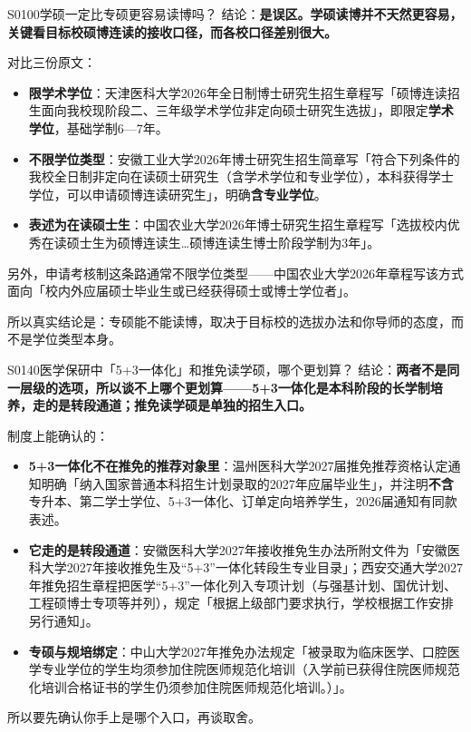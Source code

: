 \begin{qa}{S0100}{学硕一定比专硕更容易读博吗？}
结论：\textbf{是误区。学硕读博并不天然更容易，关键看目标校硕博连读的接收口径，而各校口径差别很大。}

对比三份原文：
\begin{itemize}
  \item \textbf{限学术学位}：天津医科大学2026年全日制博士研究生招生章程写「硕博连读招生面向我校现阶段二、三年级学术学位非定向硕士研究生选拔」，即限定\textbf{学术学位}，基础学制6—7年。
  \item \textbf{不限学位类型}：安徽工业大学2026年博士研究生招生简章写「符合下列条件的我校全日制非定向在读硕士研究生（含学术学位和专业学位），本科获得学士学位，可以申请硕博连读研究生」，明确\textbf{含专业学位}。
  \item \textbf{表述为在读硕士生}：中国农业大学2026年博士研究生招生章程写「选拔校内优秀在读硕士生为硕博连读生…硕博连读生博士阶段学制为3年」。
\end{itemize}

另外，申请考核制这条路通常不限学位类型——中国农业大学2026年章程写该方式面向「校内外应届硕士毕业生或已经获得硕士或博士学位者」。

所以真实结论是：专硕能不能读博，取决于目标校的选拔办法和你导师的态度，而不是学位类型本身。
\end{qa}

\begin{qa}{S0140}{医学保研中「5+3一体化」和推免读学硕，哪个更划算？}
结论：\textbf{两者不是同一层级的选项，所以谈不上哪个更划算——5+3一体化是本科阶段的长学制培养，走的是转段通道；推免读学硕是单独的招生入口。}

制度上能确认的：
\begin{itemize}
  \item \textbf{5+3一体化不在推免的推荐对象里}：温州医科大学2027届推免推荐资格认定通知明确「纳入国家普通本科招生计划录取的2027年应届毕业生」，并注明\textbf{不含}专升本、第二学士学位、5+3一体化、订单定向培养学生，2026届通知有同款表述。
  \item \textbf{它走的是转段通道}：安徽医科大学2027年接收推免生办法所附文件为「安徽医科大学2027年接收推免生及“5+3”一体化转段生专业目录」；西安交通大学2027年推免招生章程把医学“5+3”一体化列入专项计划（与强基计划、国优计划、工程硕博士专项等并列），规定「根据上级部门要求执行，学校根据工作安排另行通知」。
  \item \textbf{专硕与规培绑定}：中山大学2027年推免办法规定「被录取为临床医学、口腔医学专业学位的学生均须参加住院医师规范化培训（入学前已获得住院医师规范化培训合格证书的学生仍须参加住院医师规范化培训。）」。
\end{itemize}

所以要先确认你手上是哪个入口，再谈取舍。
\end{qa}

